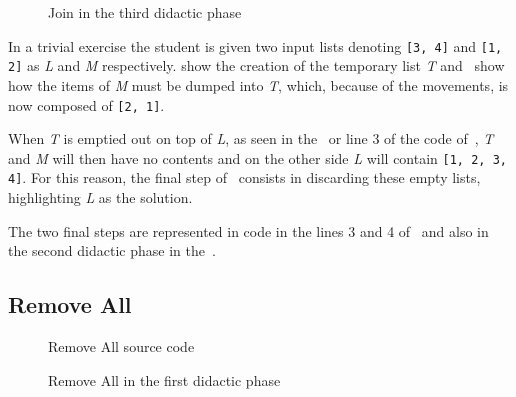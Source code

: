 \begin{figure}[h!]
  \centering
  \caption{Join in the third didactic phase}
\end{figure}

In a trivial exercise the student is given two input lists denoting
\texttt{[3, 4]} and \texttt{[1, 2]} as \emph{L} and \emph{M}
respectively.  show the creation of the
temporary list \emph{T} and~ show how the
items of \emph{M} must be dumped into \emph{T}, which, because of the
movements, is now composed of \texttt{[2, 1]}.

When \emph{T} is emptied out on top of \emph{L}, as seen
in the~ or line 3 of the code
of~, \emph{T} and \emph{M} will then have no
contents and on the other side \emph{L} will contain
\texttt{[1, 2, 3, 4]}. For this reason, the final step
of~ consists in discarding these empty lists,
highlighting \emph{L} as the solution.

The two final steps are represented in \erlang code in the lines 3
and 4 of~ and also in the second didactic phase in
the~.

\FloatBarrier
\subsection{Remove All} \label{sec:removeall}

\renewcommand*\FancyVerbStartString{BEGIN-REMALL}
\renewcommand*\FancyVerbStopString{END-REMALL}
\begin{figure}[h!]
  \caption{Remove All source code}
  \label{fig:code:remall}
\end{figure}

\begin{figure}[h!]
  \centering
  \caption{Remove All in the first didactic phase}
\end{figure}

